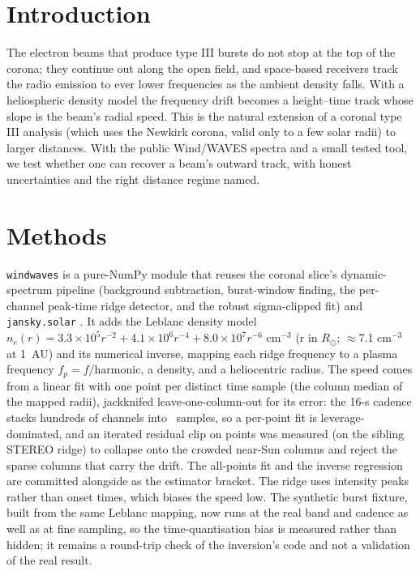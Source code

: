 \documentclass[twocolumn]{aastex631}
\newcommand{\code}[1]{\texttt{#1}}
\begin{document}
\section{Introduction}
The electron beams that produce type III bursts do not stop at the top of the corona; they continue out
along the open field, and space-based receivers track the radio emission to ever lower frequencies as
the ambient density falls. With a heliospheric density model the frequency drift becomes a
height--time track whose slope is the beam's radial speed. This is the natural extension of a coronal
type III analysis (which uses the Newkirk corona, valid only to a few solar radii) to larger distances.
With the public Wind/WAVES spectra and a small tested tool, we test whether one can recover a beam's
outward track, with honest uncertainties and the right distance regime named.

\section{Methods}
\code{windwaves} is a pure-NumPy module that reuses the coronal slice's dynamic-spectrum pipeline
(background subtraction, burst-window finding, the per-channel peak-time ridge detector, and the robust
sigma-clipped fit) and \code{jansky.solar} \citep{jansky}. It adds the Leblanc density model
$n_e(r)=3.3\times10^{5}r^{-2}+4.1\times10^{6}r^{-4}+8.0\times10^{7}r^{-6}$ cm$^{-3}$ (r in $R_\odot$;
$\approx$7.1 cm$^{-3}$ at 1~AU) and its numerical inverse, mapping each ridge frequency to a plasma
frequency $f_p=f/\mathrm{harmonic}$, a density, and a heliocentric radius. The speed comes from a
linear fit with one point per distinct time sample (the column median of the mapped radii),
jackknifed leave-one-column-out for its error: the 16-s cadence stacks hundreds of channels into
\wwRealNtimeCols\ samples, so a per-point fit is leverage-dominated, and an iterated residual clip
on points was measured (on the sibling STEREO ridge) to collapse onto the crowded near-Sun columns
and reject the sparse columns that carry the drift. The all-points fit and the inverse regression
are committed alongside as the estimator bracket. The ridge uses intensity peaks rather than onset
times, which biases the speed low. The synthetic burst fixture, built from the same Leblanc mapping, now runs at the real band and cadence as well as at fine sampling, so the
time-quantisation bias is measured rather than hidden; it remains a round-trip check of the
inversion's code and not a validation of the real result.
\end{document}
